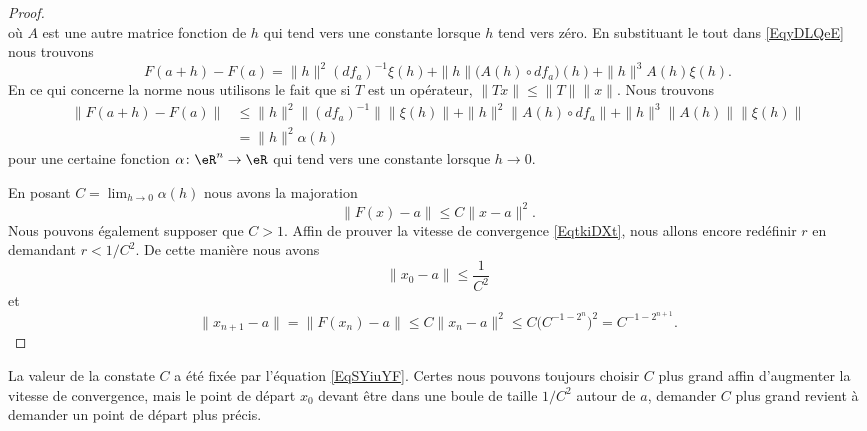 \begin{proof}
\begin{equation}
        \end{equation}
        où \( A\) est une autre matrice fonction de \(h\) qui tend vers une constante lorsque \( h\) tend vers zéro. En substituant le tout dans \eqref{EqyDLQeE} nous trouvons
        \begin{equation}
            F(a+h)-F(a)=\| h \|^2(df_a)^{-1}\xi(h)+\| h \|\big( A(h)\circ df_a \big)(h)+\| h \|^3A(h)\xi(h).
        \end{equation}
        En ce qui concerne la norme nous utilisons le fait que si \( T\) est un opérateur, \( \| Tx \|\leq \| T \|\| x \|\). Nous trouvons
        \begin{subequations}
            \begin{align}
                \| F(a+h)-F(a) \|&\leq \| h \|^2\| (df_a)^{-1} \|\| \xi(h) \|+\| h \|^2\| A(h)\circ df_a \|+\| h \|^3\| A(h) \|\| \xi(h) \|\\
                &=\| h \|^2\alpha(h)
            \end{align}
        \end{subequations}
    pour une certaine fonction \( \alpha\colon \eR^n\to \eR\) qui tend vers une constante lorsque \( h\to 0\). 

    En posant \( C=\lim_{h\to 0}\alpha(h) \) nous avons la majoration
    \begin{equation}        \label{EqSYiuYF}
        \| F(x)-a \|\leq C\| x-a \|^2.
    \end{equation}
    Nous pouvons également supposer que \( C>1\). Affin de prouver la vitesse de convergence \eqref{EqtkiDXt}, nous allons encore redéfinir \( r\) en demandant \( r<1/C^2\). De cette manière nous avons
    \begin{equation}
        \| x_0-a \|\leq \frac{1}{ C^2 }
    \end{equation}
    et
    \begin{equation}
        \| x_{n+1}-a \|=\| F(x_n)-a \|\leq C\| x_n-a \|^2\leq C\big( C^{-1-2^n} \big)^2=C^{-1-2^{n+1}}.
    \end{equation}

\end{proof}

\begin{remark}
    La valeur de la constate \( C\) a été fixée par l'équation \eqref{EqSYiuYF}. Certes nous pouvons toujours choisir \( C\) plus grand affin d'augmenter la vitesse de convergence, mais le point de départ \( x_0\) devant être dans une boule de taille \( 1/C^2\) autour de \( a\), demander \( C \) plus grand revient à demander un point de départ plus précis.
\end{remark}

